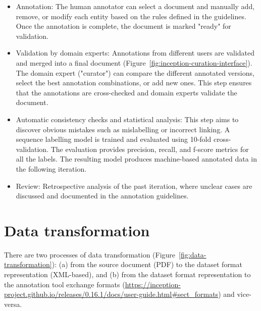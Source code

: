 \begin{itemize}
\item Annotation: The human annotator can select a document and manually add, remove, or modify each entity based on the rules defined in the guidelines. Once the annotation is complete, the document is marked "ready" for validation. 

\item Validation by domain experts: Annotations from different users are validated and merged into a final document (Figure~\ref{fig:inception-curation-interface}). 
The domain expert ("curator") can compare the different annotated versions, select the best annotation combinations, or add new ones. 
This step ensures that the annotations are cross-checked and domain experts validate the document.

\item Automatic consistency checks and statistical analysis: This step aims to discover obvious mistakes such as mislabelling or incorrect linking. 
A sequence labelling model is trained and evaluated using 10-fold cross-validation. The evaluation provides precision, recall, and f-score metrics for all the labels.
The resulting model produces machine-based annotated data in the following iteration.

\item Review: Retrospective analysis of the past iteration, where unclear cases are discussed and documented in the annotation guidelines. 

\end{itemize}

\section{Data transformation}
\label{subsec:transformation-of-data}
There are two processes of data transformation (Figure~\ref{fig:data-transformation}): (a) from the source document (PDF) to the dataset format representation (XML-based), and (b) from the dataset format representation to the annotation tool exchange formats (\url{https://inception-project.github.io/releases/0.16.1/docs/user-guide.html\#sect_formats}) and vice-versa. 

